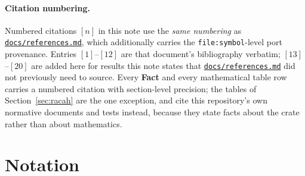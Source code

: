 \documentclass[11pt,a4paper]{article}
\theoremstyle{plain}
\theoremstyle{definition}
\newcommand{\code}[1]{\texttt{#1}}
\newcommand{\refsmd}{\href{https://github.com/Ryo-wtnb11/fusion-symbols/blob/main/docs/references.md}{\code{docs/references.md}}}
\begin{document}
\paragraph{Citation numbering.} Numbered citations $[n]$ in this note use the
\emph{same numbering} as \refsmd{}, which additionally carries the
\code{file:symbol}-level port provenance. Entries $[1]$--$[12]$ are that
document's bibliography verbatim; $[13]$--$[20]$ are added here for results
this note states that \refsmd{} did not previously need to source. Every
\textbf{Fact} and every mathematical table row carries a numbered citation
with section-level precision; the tables of Section~\ref{sec:racah} are the
one exception, and cite this repository's own normative documents and tests
instead, because they state facts about the crate rather than about
mathematics.

\section{Notation}
\end{document}
